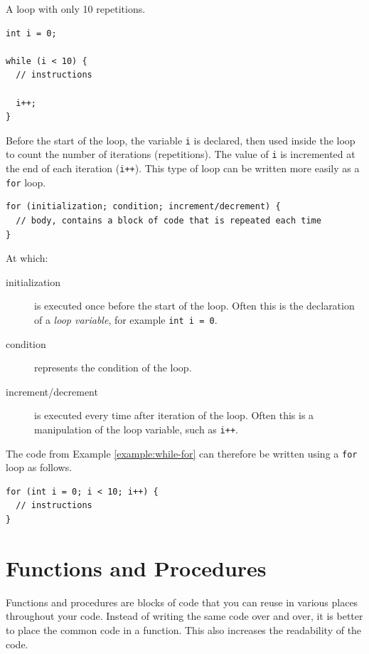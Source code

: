 \documentclass[11pt,fleqn]{book} %
\begin{document}
\begin{example}
	\label{example:while-for}
	\phantom{ }
    A loop with only 10 repetitions.
	\begin{verbatim}
int i = 0;

while (i < 10) {
  // instructions

  i++;
}
	\end{verbatim}
\end{example}

\noindent
Before the start of the loop, the variable \texttt{i} is declared, then used inside the loop to count the number of iterations (repetitions). The value of \texttt{i} is incremented at the end of each iteration (\texttt{i++}). This type of loop can be written more easily as a \texttt{for} loop.

\begin{definition}[For]
	\phantom{ }
	\begin{verbatim}
for (initialization; condition; increment/decrement) {
  // body, contains a block of code that is repeated each time
}
	\end{verbatim}
	At which:
	\begin{description}
        \item[initialization] is executed once before the start of the loop. Often this is the declaration of a \emph{loop variable}, for example \texttt{int i = 0}.
		\item[condition] represents the condition of the loop.
		\item[increment/decrement] is executed every time after iteration of the loop. Often this is a manipulation of the loop variable, such as \texttt{i++}.
	\end{description}
\end{definition}
\noindent
The code from Example \ref{example:while-for} can therefore be written using a \texttt{for} loop as follows.

\begin{example}
	\phantom{ }
	\begin{verbatim}
for (int i = 0; i < 10; i++) {
  // instructions
}
	\end{verbatim}
\end{example}

\chapter{Functions and Procedures}
Functions and procedures are blocks of code that you can reuse in various places throughout your code. Instead of writing the same code over and over, it is better to place the common code in a function. This also increases the readability of the code.
\end{document}
